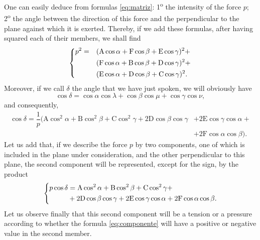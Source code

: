 \documentclass[leqno,openright,smallroyalvopaper,8pt,twoside,showtrims]{memoir}
\begin{document}
One can easily deduce from formulas \eqref{eq:matriz}:  1\textsuperscript{o} the intensity of the force $p$; 2\textsuperscript{o} the angle between the direction of this force and the perpendicular to the plane against which it is exerted. Thereby, if we add these formulas, after having squared each of their members, we shall find
\begin{align}\label{eq:p2}
\begin{dcases}
p^2 = &(\text{A}\cos\alpha+\text{F}\cos\beta+\text{E}\cos\gamma)^2+\\
&(\text{F}\cos\alpha+\text{B}\cos\beta+\text{D}\cos\gamma)^2+\\
&(\text{E}\cos\alpha+\text{D}\cos\beta+\text{C}\cos\gamma)^2.
\end{dcases}
\end{align}
Moreover, if we call $\delta$ the angle that we have just spoken, we will obviously have
\begin{equation}
\cos\delta = \cos\alpha\cos\lambda + \cos\beta\cos\mu+\cos\gamma\cos\nu,
\end{equation}
and consequently,
\begin{align}
\cos\delta = \dfrac{1}{p}(\text{A}\cos^2\alpha+\text{B}\cos^2\beta+\text{C}\cos^2\gamma+2\text{D}\cos\beta\cos\gamma &+2\text{E}\cos\gamma\cos\alpha+\\
&+2\text{F}\cos\alpha\cos\beta).\nonumber
\end{align}
Let us add that, if we describe the force $p$ by two components, one of which is included in the plane under consideration, and the other perpendicular to this plane, the second component will be represented, except for the sign, by the product
\begin{equation}\label{eq:componente}
\begin{dcases}
\begin{aligned}
p\cos\delta &= \text{A}\cos^2\alpha+\text{B}\cos^2\beta+\text{C}\cos^2\gamma+\\
&+2\text{D}\cos\beta\cos\gamma +2\text{E}\cos\gamma\cos\alpha+2\text{F}\cos\alpha\cos\beta.
\end{aligned}
\end{dcases}
\end{equation}
Let us observe finally that this second component will be a tension or a pressure according to whether the formula \eqref{eq:componente} will have a positive or negative value in the second member.
\end{document}
